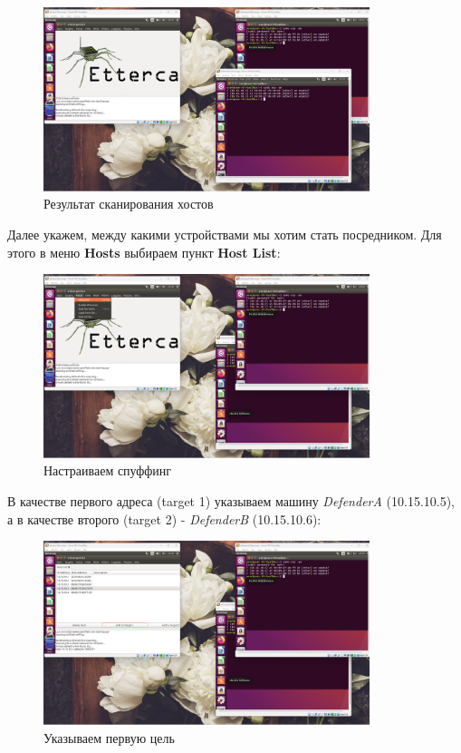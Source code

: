 \documentclass[a4paper]{article}
\begin{document}
  \begin{figure}[H]
    \centering
    \includegraphics[width=0.85\textwidth]{02_00 (51)}
    \caption{Результат сканирования хостов}
    \label{img:0038}
  \end{figure}

  Далее укажем, между какими устройствами мы хотим стать посредником. Для этого в меню \textbf{Hosts}
  выбираем пункт \textbf{Host List}:

  \begin{figure}[H]
    \centering
    \includegraphics[width=0.85\textwidth]{02_00 (52)}
    \caption{Настраиваем спуффинг}
    \label{img:0039}
  \end{figure}

  В качестве первого адреса (target 1) указываем машину \textit{DefenderA} (10.15.10.5), а 
  в качестве второго (target 2) - \textit{DefenderB} (10.15.10.6):

  \begin{figure}[H]
    \centering
    \includegraphics[width=0.85\textwidth]{02_00 (53)}
    \caption{Указываем первую цель}
    \label{img:0040}
  \end{figure}
\end{document}
